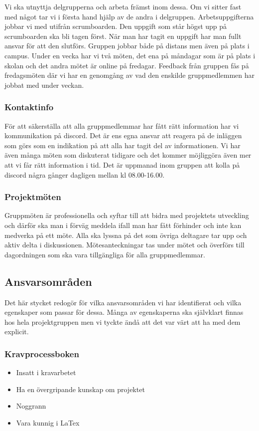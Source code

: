 \documentclass{article}
\begin{document}
Vi ska utnyttja delgrupperna och arbeta främst inom dessa. Om vi sitter fast med något tar
vi i första hand hjälp av de andra i delgruppen. Arbetsuppgifterna jobbar vi med utifrån
scrumboarden. Den uppgift som står högst upp på scrumboarden ska bli tagen först. När man har tagit en uppgift har man fullt ansvar för
att den slutförs. Gruppen jobbar både på distans men även på plats i campus. Under en
vecka har vi två möten, det ena på måndagar som är på plats i skolan och det andra mötet är
online på fredagar. Feedback från gruppen fås på fredagsmöten där vi har en genomgång av
vad den enskilde gruppmedlemmen har jobbat med under veckan.

\subsubsection{Kontaktinfo}

För att säkerställa att alla gruppmedlemmar har fått rätt information har vi kommunikation på
discord. Det är ens egna ansvar att reagera på de inläggen som görs som en indikation på att
alla har tagit del av informationen. Vi har även många möten som diskuterat tidigare och det
kommer möjliggöra även mer att vi får rätt information i tid. Det är uppmanad inom gruppen
att kolla på discord några gånger dagligen mellan kl 08.00-16.00.

\subsubsection{Projektmöten}

Gruppmöten är professionella och syftar till att bidra med projektets utveckling och därför
ska man i förväg meddela ifall man har fått förhinder och inte kan medverka på ett möte. Alla
ska lyssna på det som övriga deltagare tar upp och aktiv delta i diskussionen.
Mötesanteckningar tas under mötet och överförs till dagordningen som ska vara tillgängliga
för alla gruppmedlemmar.

\subsection{Ansvarsområden}
Det här stycket redogör för vilka ansvarsområden vi har identifierat och vilka egenskaper som passar för dessa. Många av egenskaperna ska självklart finnas hos hela projektgruppen men vi tyckte ändå att det var värt att ha med dem explicit.

\subsubsection{Kravprocessboken}
\begin{itemize}
\item Insatt i kravarbetet
\item Ha en övergripande kunskap om projektet
\item Noggrann
\item Vara kunnig i LaTex
\end{itemize}
\end{document}
